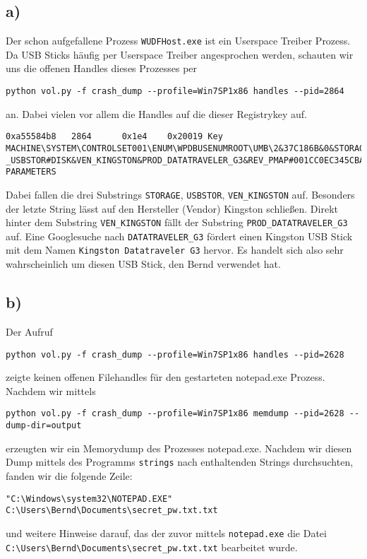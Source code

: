 \documentclass[10pt,a4paper]{article}
\begin{document}
\subsection*{a)}
Der schon aufgefallene Prozess \texttt{WUDFHost.exe} ist ein Userspace Treiber Prozess. Da USB Sticks häufig per Userspace Treiber angesprochen werden, schauten wir uns die offenen Handles dieses Prozesses per 
\begin{verbatim}
python vol.py -f crash_dump --profile=Win7SP1x86 handles --pid=2864
\end{verbatim}
an. Dabei vielen vor allem die Handles auf die dieser Registrykey auf.
\begin{lstlisting}
0xa55584b8   2864      0x1e4    0x20019 Key              MACHINE\SYSTEM\CONTROLSET001\ENUM\WPDBUSENUMROOT\UMB\2&37C186B&0&STORAGE#VOLUME#_??_USBSTOR#DISK&VEN_KINGSTON&PROD_DATATRAVELER_G3&REV_PMAP#001CC0EC345CBA9175C40135&0#\DEVICE PARAMETERS
\end{lstlisting}
Dabei fallen die drei Substrings  \texttt{STORAGE}, \texttt{USBSTOR}, \texttt{VEN\_KINGSTON} auf. Besonders der letzte String lässt auf den Hersteller (Vendor) Kingston schließen. Direkt hinter dem Substring \texttt{VEN\_KINGSTON} fällt der Substring \texttt{PROD\_DATATRAVELER\_G3} auf. Eine Googlesuche nach \texttt{DATATRAVELER\_G3} fördert einen Kingston USB Stick mit dem Namen \texttt{Kingston Datatraveler G3} hervor. Es handelt sich also sehr wahrscheinlich um diesen USB Stick, den Bernd verwendet hat.

\subsection*{b)}

Der Aufruf
\begin{verbatim}
python vol.py -f crash_dump --profile=Win7SP1x86 handles --pid=2628
\end{verbatim}
zeigte keinen offenen Filehandles für den gestarteten notepad.exe Prozess.
Nachdem wir mittels
\begin{verbatim}
python vol.py -f crash_dump --profile=Win7SP1x86 memdump --pid=2628 --dump-dir=output
\end{verbatim}
erzeugten wir ein Memorydump des Prozesses notepad.exe. Nachdem wir diesen Dump mittels des Programms \texttt{strings} nach enthaltenden Strings durchsuchten, fanden wir die folgende Zeile:
\begin{verbatim}
"C:\Windows\system32\NOTEPAD.EXE" C:\Users\Bernd\Documents\secret_pw.txt.txt
\end{verbatim}
und weitere Hinweise darauf, das der zuvor mittels \texttt{notepad.exe} die Datei \\\texttt{C:\textbackslash Users\textbackslash Bernd\textbackslash Documents\textbackslash secret\_pw.txt.txt} bearbeitet wurde.
\end{document}
